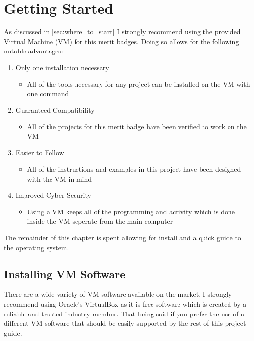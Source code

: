 \graphicspath{ {../src/images/} {./images/} }

\chapter{Getting Started}
\label{chap:getting_started}

  As discussed in \autoref{sec:where_to_start} I strongly recommend using the provided
    Virtual Machine (VM) for this merit badges.
  Doing so allows for the following notable advantages:

  \begin{enumerate}
    \item Only one installation necessary
    \begin{itemize}
      \item All of the tools necessary for any project can be installed on the VM with one command
    \end{itemize}
    \item Guaranteed Compatibility
    \begin{itemize}
      \item All of the projects for this merit badge have been verified to work on the VM
    \end{itemize}
    \item Easier to Follow
    \begin{itemize}
      \item All of the instructions and examples in this project have been designed with the VM in mind
    \end{itemize}
    \item Improved Cyber Security
    \begin{itemize}
      \item Using a VM keeps all of the programming and activity which is done inside the VM seperate from the main computer
    \end{itemize}
  \end{enumerate}

  The remainder of this chapter is spent allowing for install and a quick guide to the operating system.

  \section{Installing VM Software}
  \label{sec:installing_vm_software}

    There are a wide variety of VM software available on the market.
    I strongly recommend using Oracle's VirtualBox as it is free software which is created by a 
      reliable and trusted industry member.
    That being said if you prefer the use of a different VM software that should be easily supported
      by the rest of this project guide.

